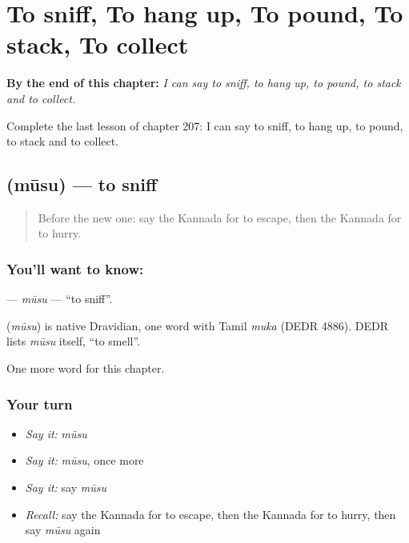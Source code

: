 
\chapter{To sniff, To hang up, To pound, To stack, To collect}
\label{ch:ka-to-sniff-to-hang-up-to-pound-to-stack-to-collect}

\begin{chapteropening}
\textbf{By the end of this chapter:} \emph{I can say to sniff, to hang up, to pound, to stack and to collect.}

Complete the last lesson of chapter 207: I can say to sniff, to hang up, to pound, to stack and to collect.
\end{chapteropening}

\section[\texorpdfstring{\kn{ಮೂಸು} (mūsu)}{ಮೂಸು (mūsu)}]{ (mūsu) — to sniff}

\label{lesson:KA-C207-musu}



\begin{quote}
Before the new one: say the Kannada for to escape, then the Kannada for to hurry.
\end{quote}

\subsection*{You'll want to know: }
\textbf{} — \emph{mūsu} — \textquotedblleft{}to sniff\textquotedblright{}.

\begin{cousinweb}
\textbf{} (\emph{mūsu}) is native Dravidian, one word with Tamil \emph{muka} (DEDR 4886). DEDR lists \emph{mūsu} itself, \textquotedblleft{}to smell\textquotedblright{}.
\end{cousinweb}

\begin{grammarlens}[title={What you've built}]
One more word for this chapter.
\end{grammarlens}

\subsection*{Your turn}
\begin{itemize}
\raggedright
  \item \emph{Say it:} \emph{mūsu}
  \item \emph{Say it:} \emph{mūsu}, once more
  \item \emph{Say it:} say \emph{mūsu}
  \item \emph{Recall:} say the Kannada for to escape, then the Kannada for to hurry, then say \emph{mūsu} again
\end{itemize}

